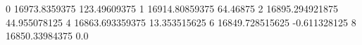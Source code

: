 0 16973.8359375 123.49609375
1 16914.80859375 64.46875
2 16895.294921875 44.955078125
4 16863.693359375 13.353515625
6 16849.728515625 -0.611328125
8 16850.33984375 0.0
